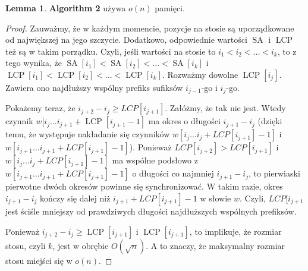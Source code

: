 \documentclass[a4paper,12pt]{article}
\theoremstyle{definition}
\newtheorem{lemma}{Lemma}[section]
\DeclareMathOperator{\SA}{SA}
\DeclareMathOperator{\LCP}{LCP}
\begin{document}
\begin{lemma}

\textbf{Algorithm 2} używa $o(n)$ pamięci.

\begin{proof}

Zauważmy, że w każdym momencie, pozycje na stosie są uporządkowane od największej na jego szczycie.
Dodatkowo, odpowiednie wartości $\SA$ i $\LCP$ też są w takim porządku.
Czyli, jeśli wartości na stosie to $i_1 < i_2 < ... < i_k$, to z tego wynika,
 że $\SA[i_1] < \SA[i_2] < ... < \SA[i_k]$ i $\LCP[i_1] < \LCP[i_2] < ... < \LCP[i_k]$.
Rozważmy dowolne $\LCP[i_j]$. Zawiera ono najdłuższy wspólny prefiks sufiksów $i_{j-1}$-go i $i_{j}$-go.

Pokażemy teraz, że $i_{j + 2} - i_{j} \geq LCP[i_{j + 1}]$.
Załóżmy, że tak nie jest.
Wtedy czynnik $w[i_j ... i_{j + 1} + \LCP[i_{j + 1} - 1]$ ma okres o długości $i_{j + 1} - i_{j}$
 (dzięki temu, że występuje nakładanie się czynników $w[i_{j} ... i_{j} + LCP[i_{j + 1}] - 1]$
  i $w[i_{j + 1} ... i_{j + 1} + LCP[i_{j + 1}] - 1]$).
Ponieważ $LCP[i_{j + 2}] > LCP[i_{j + 1}]$ i $w[i_{j} ... i_{j} + LCP[i_{j + 1}] - 1]$
 ma wspólne podsłowo z $w[i_{j + 1} ... i_{j + 1} + LCP[i_{j + 1}] - 1]$
 o długości co najmniej $i_{j + 1} - i_{j}$,
 to pierwiaski pierwotne dwóch okresów powinne się synchronizować.
W takim razie, okres $i_{j + 1} - i_{j}$ kończy się dalej niż $i_{j + 1} + LCP[i_{j + 1}] - 1$ w słowie $w$.
Czyli, $LCP[i_{j + 1}$ jest ściśle mniejszy od prawdziwych długości najdłuższych wspólnych prefiksów.

Ponieważ $i_{j + 2} - i_{j} \geq \LCP[i_{j + 1}]$ i $\LCP[i_{j + 1}]$, to implikuje,
 że rozmiar stosu, czyli $k$, jest w obrębie $O(\sqrt{n})$.
A to znaczy, że maksymalny rozmiar stosu miejści się w $o(n)$.

\end{proof}
\end{lemma}
\end{document}
